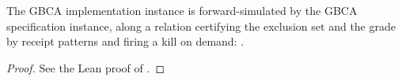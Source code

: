 \begin{theorem}
  \label{thm:gbca-inst-refines}
  \leanok
  The GBCA implementation instance is forward-simulated by the GBCA specification instance, along a relation certifying the exclusion set and the grade by receipt patterns and firing a kill on demand: .
\end{theorem}

\begin{proof}\leanok
  See the Lean proof of .
\end{proof}
